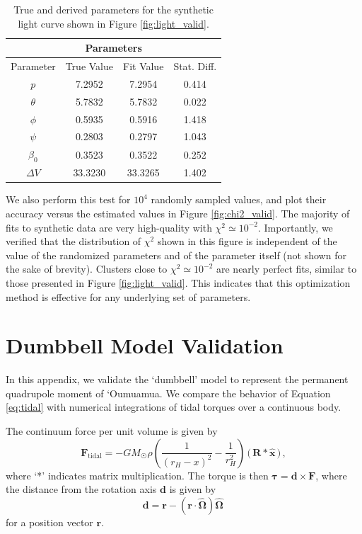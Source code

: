 \documentclass[twocolumn,doublespacing]{aastex631}
\begin{document}
\begin{table}
\centering
\begin{tabular}{|c|c|c|c|}
 \hline
 \multicolumn{4}{||c||}{Parameters} \\ \hline\hline
 Parameter & True Value & Fit Value & Stat. Diff. \\ \hline
 $p$ & 7.2952 & 7.2954 & 0.414 \\ \hline
 $\theta$ & 5.7832 & 5.7832 & 0.022 \\ \hline
 $\phi$ & 0.5935 & 0.5916 & 1.418 \\ \hline
 $\psi$ & 0.2803 & 0.2797 & 1.043 \\ \hline
 $\beta_0$ & 0.3523 & 0.3522 & 0.252 \\ \hline
 $\Delta V$ & 33.3230 & 33.3265 & 1.402 \\ \hline
\end{tabular}
\caption{True and derived parameters for the synthetic light curve shown in Figure \ref{fig:light_valid}.}
\label{table:lightvalid}
\end{table}

We also perform this test for $10^4$ randomly sampled values, and plot their accuracy versus the estimated values in Figure \ref{fig:chi2_valid}. The majority of fits to synthetic data are very high-quality with $\chi^2\simeq10^{-2}$. Importantly, we verified that the distribution of $\chi^2$ shown in this figure is independent of the value of the randomized parameters and of the parameter itself (not shown for the sake of brevity). Clusters close to $\chi^2\simeq10^{-2}$ are nearly perfect fits, similar to those presented in Figure \ref{fig:light_valid}. This indicates that this optimization method is effective for any underlying set of parameters. 

\section{Dumbbell Model Validation}\label{sec:dumbval}

In this appendix, we validate the `dumbbell' model to represent the permanent quadrupole moment of `Oumuamua. We compare the behavior of Equation \ref{eq:tidal} with numerical integrations of tidal torques over a continuous body. 

The continuum force per unit volume is given by 
\begin{equation}
    \boldsymbol{F}_{\text{tidal}}=- GM_{\Sun}\rho\left(\frac{1}{(r_H-x)^2}-\frac{1}{r_H^2}\right) \,\big(\,\boldsymbol{R}*\boldsymbol{\hat{x}}\,\big)\,,
\end{equation}
where `*' indicates matrix multiplication. The torque is then $\boldsymbol{\tau}=\boldsymbol{d}\times\boldsymbol{F}$, where the distance from the rotation axis $\boldsymbol{d}$ is given by
\begin{equation}
    \boldsymbol{d}=\boldsymbol{r}-(\boldsymbol{r}\cdot\boldsymbol{\hat{\Omega}})\boldsymbol{\hat{\Omega}}\,
\end{equation}
for a position vector $\boldsymbol{r}$. 
\end{document}
